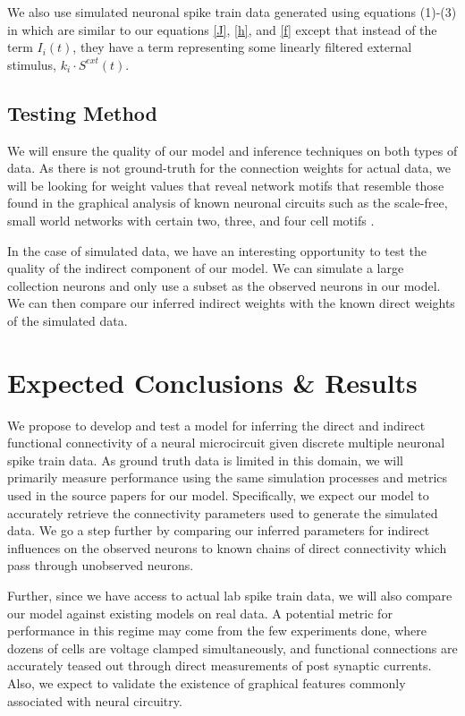 \documentclass{article}
\begin{document}
We also use simulated neuronal spike train data generated using equations (1)-(3) in \citep{mishchencko2011} which are similar to our equations \eqref{J}, \eqref{h}, and \eqref{f} except that instead of the term $I_i(t)$, they have a term representing some linearly filtered external stimulus, $k_i \cdot S^{ext}(t)$.

\subsection{Testing Method}

We will ensure the quality of our model and inference techniques on both types of data. As there is not ground-truth for the connection weights for actual data, we will be looking for weight values that reveal network motifs that resemble those found in the graphical analysis of known neuronal circuits such as the scale-free, small world networks with certain two, three, and four cell motifs \citep{song2005,perin2011}.

In the case of simulated data, we have an interesting opportunity to test the quality of the indirect component of our model. We can simulate a large collection neurons and only use a subset as the observed neurons in our model. We can then compare our inferred indirect weights with the known direct weights of the simulated data.

\section{Expected Conclusions \& Results}
We propose to develop and test a model for inferring the direct and indirect functional connectivity of a neural microcircuit given discrete multiple neuronal spike train data. As ground truth data is limited in this domain, we will primarily measure performance using the same simulation processes and metrics used in the source papers for our model.  Specifically, we expect our model to accurately retrieve the connectivity parameters used to generate the simulated data. We go a step further by comparing our inferred parameters for indirect influences on the observed neurons to known chains of direct connectivity which pass through unobserved neurons.

Further, since we have access to actual lab spike train data, we will also compare our model against existing models on real data.  A potential metric for performance in this regime may come from the few experiments done, where dozens of cells are voltage clamped simultaneously, and functional connections are accurately teased out through direct measurements of post synaptic currents.  Also, we expect to validate the existence of graphical features commonly associated with neural circuitry.

\begin{small}

 
\end{small}
\end{document}
